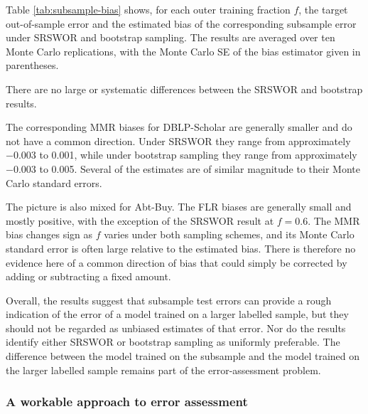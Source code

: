 Table \ref{tab:subsample-bias} shows, for each outer training fraction
$f$, the target out-of-sample error and the estimated bias of the corresponding subsample
error under SRSWOR and bootstrap sampling. The results are averaged over ten Monte
Carlo replications, with the Monte Carlo SE of the bias estimator given in parentheses.

There are no large or systematic differences between the SRSWOR and bootstrap results.


The corresponding MMR biases for DBLP-Scholar are generally smaller and do not have
a common direction. Under SRSWOR they range from approximately $-0.003$ to 0.001,
while under bootstrap sampling they range from approximately $-0.003$ to 0.005.
Several of the estimates are of similar magnitude to their Monte Carlo standard errors.

The picture is also mixed for Abt-Buy. The FLR biases are generally small and mostly
positive, with the exception of the SRSWOR result at $f=0.6$. The MMR bias changes
sign as $f$ varies under both sampling schemes, and its Monte Carlo standard error is
often large relative to the estimated bias. There is therefore no evidence here of a
common direction of bias that could simply be corrected by adding or subtracting a
fixed amount.

Overall, the results suggest that subsample test errors can provide a rough indication of
the error of a model trained on a larger labelled sample, but they should not be regarded
as unbiased estimates of that error. Nor do the results identify either SRSWOR or
bootstrap sampling as uniformly preferable. The difference between the model trained on
the subsample and the model trained on the larger labelled sample remains part of the
error-assessment problem.

\subsubsection{A workable approach to error assessment}
\label{sec:workable-error-assessment}

